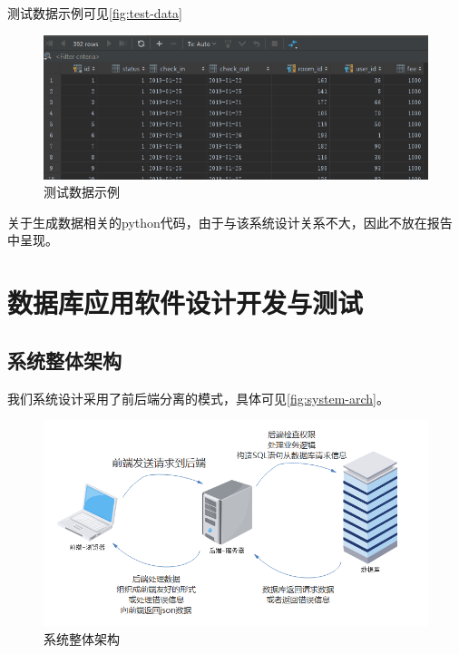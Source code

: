 \documentclass{myreport}
\begin{document}
测试数据示例可见\autoref{fig:test-data}

\begin{figure}[htp]
    \centering
    \includegraphics[width=12cm]{figure/2018-12-22-15-36-08.png}
    \caption{测试数据示例}
    \label{fig:test-data}
\end{figure}


关于生成数据相关的python代码，由于与该系统设计关系不大，因此不放在报告中呈现。

\chapter{数据库应用软件设计开发与测试}

\section{系统整体架构}

我们系统设计采用了前后端分离的模式，具体可见\autoref{fig:system-arch}。


\begin{figure}[htp]
    \centering
    \includegraphics[width=13cm]{figure/2018-12-22-12-09-07.png}
    \caption{系统整体架构}
    \label{fig:system-arch}
\end{figure}
\end{document}
